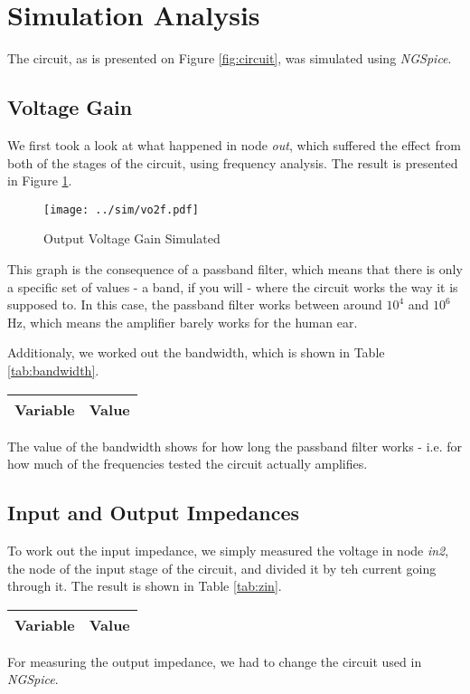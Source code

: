 \clearpage

\section{Simulation Analysis}
\label{sec:simulation}

The circuit, as is presented on Figure \ref{fig:circuit}, was simulated using \textit{NGSpice}.

\subsection{Voltage Gain}

We first took a look at what happened in node \textit{out}, which suffered the effect from both of the stages of the circuit, using frequency analysis. The result is presented in Figure \ref{fig:vo2f}.

\begin{figure}[h] \centering
\texttt{[image: ../sim/vo2f.pdf]}
\caption{Output Voltage Gain Simulated}
\label{fig:vo2f}
\end{figure}

This graph is the consequence of a passband filter, which means that there is only a specific set of values - a band, if you will - where the circuit works the way it is supposed to. In this case, the passband filter works between around $10^4$ and $10^6$ Hz, which means the amplifier barely works for the human ear.

Additionaly, we worked out the bandwidth, which is shown in Table \ref{tab:bandwidth}.

\begin{tabular}{|l|r|}
  \label{tab:bandwidth}
  \hline    
  {\bf Variable} & {\bf Value} \\ \hline
  
\end{tabular}

The value of the bandwidth shows for how long the passband filter works - i.e. for how much of the frequencies tested the circuit actually amplifies.

\subsection{Input and Output Impedances}

To work out the input impedance, we simply measured the voltage in node \textit{in2}, the node of the input stage of the circuit, and divided it by teh current going through it. The result is shown in Table \ref{tab:zin}.

\begin{tabular}{|l|r|}
\label{tab:zin}
  \hline    
  {\bf Variable} & {\bf Value} \\ \hline
  
\end{tabular}

For measuring the output impedance, we had to change the circuit used in \textit{NGSpice}.